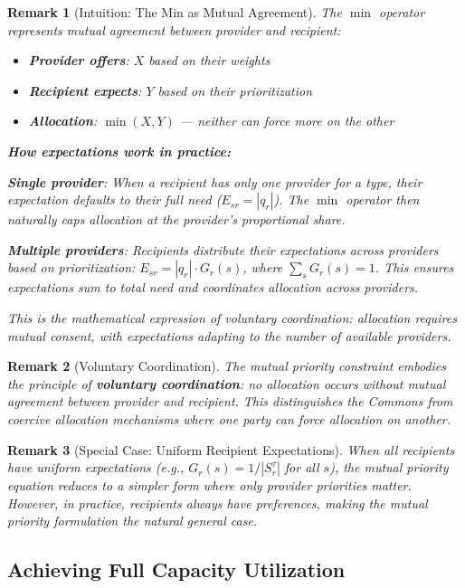 \documentclass[11pt]{article}
\newtheorem{remark}{Remark}
\begin{document}
\begin{remark}[Intuition: The Min as Mutual Agreement]
The $\min$ operator represents mutual agreement between provider and recipient:
\begin{itemize}
\item \textbf{Provider offers}: $X$ based on their weights
\item \textbf{Recipient expects}: $Y$ based on their prioritization
\item \textbf{Allocation}: $\min(X, Y)$ — neither can force more on the other
\end{itemize}

\textbf{How expectations work in practice:}

\textbf{Single provider}: When a recipient has only one provider for a type, their expectation defaults to their full need ($E_{sr} = |q_r|$). The $\min$ operator then naturally caps allocation at the provider's proportional share.

\textbf{Multiple providers}: Recipients distribute their expectations across providers based on prioritization: $E_{sr} = |q_r| \cdot G_r(s)$, where $\sum_s G_r(s) = 1$. This ensures expectations sum to total need and coordinates allocation across providers.

This is the mathematical expression of voluntary coordination: allocation requires mutual consent, with expectations adapting to the number of available providers.
\end{remark}

\begin{remark}[Voluntary Coordination]
The mutual priority constraint embodies the principle of \textbf{voluntary coordination}: no allocation occurs without mutual agreement between provider and recipient. This distinguishes the Commons from coercive allocation mechanisms where one party can force allocation on another.
\end{remark}

\begin{remark}[Special Case: Uniform Recipient Expectations]
When all recipients have uniform expectations (e.g., $G_r(s) = 1/|S_r^\tau|$ for all $s$), the mutual priority equation reduces to a simpler form where only provider priorities matter. However, in practice, recipients always have preferences, making the mutual priority formulation the natural general case.
\end{remark}

\subsection{Achieving Full Capacity Utilization}
\end{document}
